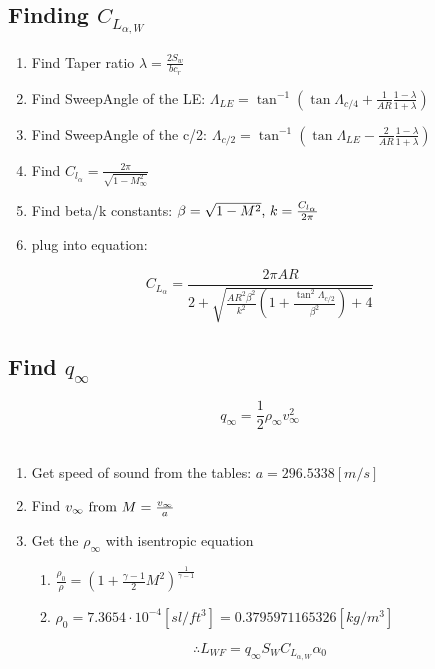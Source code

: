 \documentclass[a4paper, twoside]{article}
\begin{document}
\subsection{Finding \(C_{L_{\alpha,W}}\)}
\begin{enumerate}
\item Find Taper ratio \(\lambda = \frac{2S_w}{bc_r}\)\\
\item Find SweepAngle of the LE: \(\Lambda_{LE} = \tan^{-1}\left(\tan{\Lambda_{c/4}} + \frac{1}{AR}\frac{1-\lambda}{1+\lambda}\right)\)\\
\item Find SweepAngle of the c/2: \(\Lambda_{c/2} = \tan^{-1}\left(\tan{\Lambda_{LE}} - \frac{2}{AR}\frac{1-\lambda}{1+\lambda}\right)\)\\
\item Find \(C_{l_\alpha} = \frac{2\pi}{\sqrt{1-M_\infty^2}}\)\\
\item Find beta/k constants: \(\beta = \sqrt{1-M^2}$, $k = \frac{C_{l_\alpha}}{2\pi}\)\\
\item plug into equation:
\end{enumerate}
\[C_{L_\alpha} = \frac{2\pi AR}{2+\sqrt{\frac{AR^2\beta^2}{k^2}\left(1+\frac{\tan^2{\Lambda_{c/2}}}{\beta^2}\right)+4}}\]

\subsection{Find \(q_\infty\)}
\[q_\infty = \frac{1}{2} \rho_\infty v_\infty^2\]\\
\begin{enumerate}
\item Get speed of sound from the tables: \(a = 296.5338[m/s]\)\\
\item Find \(v_\infty$ from $M = \frac{v_\infty}{a}\)\\
\item Get the \(\rho_\infty\) with isentropic equation
  \begin{enumerate}
  \item \(\frac{\rho_0}{\rho} = \left(1+\frac{\gamma-1}{2}M^2\right)^\frac{1}{\gamma-1}\)
  \item \(\rho_0 = 7.3654\cdot10^{-4} [sl/ft^3] = 0.3795971165326[kg/m^3]\)
  \end{enumerate}
\end{enumerate}
\[ \therefore L_{WF} = q_\infty S_W C_{L_{\alpha,W}} \alpha_0\]
\end{document}
